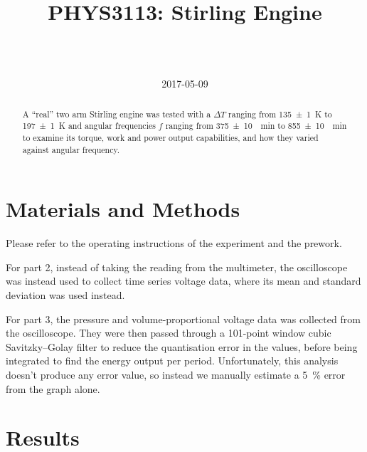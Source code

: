 \documentclass[a4paper]{scrartcl}
\begin{document}
\title{PHYS3113: Stirling Engine}
\author{ \\ \\ }
\date{2017-05-09}
\maketitle

\begin{abstract}
    A ``real'' two arm Stirling engine was tested with a \(\Delta T\) ranging from \SI{135 \pm 1}{\kelvin} to \SI{197 \pm 1}{\kelvin} and angular frequencies \(f\) ranging from \SI{375 \pm 10}{\per\minute} to \SI{855 \pm 10}{\per\minute} to examine its torque, work and power output capabilities, and how they varied against angular frequency.
\end{abstract}

\section{Materials and Methods}
Please refer to the operating instructions of the experiment and the prework.

For part 2, instead of taking the reading from the multimeter, the oscilloscope was instead used to collect time series voltage data, where its mean and standard deviation was used instead.

For part 3, the pressure and volume-proportional voltage data was collected from the oscilloscope. They were then passed through a 101-point window cubic Savitzky--Golay filter to reduce the quantisation error in the values, before being integrated to find the energy output per period. Unfortunately, this analysis doesn't produce any error value, so instead we manually estimate a \SI{5}{\percent} error from the graph alone.

\section{Results}
\end{document}
